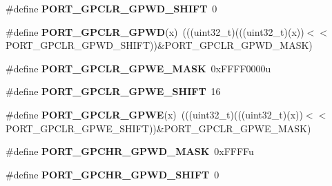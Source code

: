 \begin{DoxyCompactItemize}
\item 
\#define {\bfseries P\+O\+R\+T\+\_\+\+G\+P\+C\+L\+R\+\_\+\+G\+P\+W\+D\+\_\+\+S\+H\+I\+FT}~0\hypertarget{group__PORT__Register__Masks_gaafacaac0aa215f596b947609857d6491}{}\label{group__PORT__Register__Masks_gaafacaac0aa215f596b947609857d6491}

\item 
\#define {\bfseries P\+O\+R\+T\+\_\+\+G\+P\+C\+L\+R\+\_\+\+G\+P\+WD}(x)~(((uint32\+\_\+t)(((uint32\+\_\+t)(x))$<$$<$P\+O\+R\+T\+\_\+\+G\+P\+C\+L\+R\+\_\+\+G\+P\+W\+D\+\_\+\+S\+H\+I\+FT))\&P\+O\+R\+T\+\_\+\+G\+P\+C\+L\+R\+\_\+\+G\+P\+W\+D\+\_\+\+M\+A\+SK)\hypertarget{group__PORT__Register__Masks_gae13a63b19950557e19c9a884f3d3b77a}{}\label{group__PORT__Register__Masks_gae13a63b19950557e19c9a884f3d3b77a}

\item 
\#define {\bfseries P\+O\+R\+T\+\_\+\+G\+P\+C\+L\+R\+\_\+\+G\+P\+W\+E\+\_\+\+M\+A\+SK}~0x\+F\+F\+F\+F0000u\hypertarget{group__PORT__Register__Masks_ga49c4160370859546837be80a2eed1365}{}\label{group__PORT__Register__Masks_ga49c4160370859546837be80a2eed1365}

\item 
\#define {\bfseries P\+O\+R\+T\+\_\+\+G\+P\+C\+L\+R\+\_\+\+G\+P\+W\+E\+\_\+\+S\+H\+I\+FT}~16\hypertarget{group__PORT__Register__Masks_ga340d6aadd9516b3cac26187b014ce9d3}{}\label{group__PORT__Register__Masks_ga340d6aadd9516b3cac26187b014ce9d3}

\item 
\#define {\bfseries P\+O\+R\+T\+\_\+\+G\+P\+C\+L\+R\+\_\+\+G\+P\+WE}(x)~(((uint32\+\_\+t)(((uint32\+\_\+t)(x))$<$$<$P\+O\+R\+T\+\_\+\+G\+P\+C\+L\+R\+\_\+\+G\+P\+W\+E\+\_\+\+S\+H\+I\+FT))\&P\+O\+R\+T\+\_\+\+G\+P\+C\+L\+R\+\_\+\+G\+P\+W\+E\+\_\+\+M\+A\+SK)\hypertarget{group__PORT__Register__Masks_ga52502515ea180d574d919f0ec155da74}{}\label{group__PORT__Register__Masks_ga52502515ea180d574d919f0ec155da74}

\item 
\#define {\bfseries P\+O\+R\+T\+\_\+\+G\+P\+C\+H\+R\+\_\+\+G\+P\+W\+D\+\_\+\+M\+A\+SK}~0x\+F\+F\+F\+Fu\hypertarget{group__PORT__Register__Masks_ga4f288d1140184d41384f459c263d6e63}{}\label{group__PORT__Register__Masks_ga4f288d1140184d41384f459c263d6e63}

\item 
\#define {\bfseries P\+O\+R\+T\+\_\+\+G\+P\+C\+H\+R\+\_\+\+G\+P\+W\+D\+\_\+\+S\+H\+I\+FT}~0\hypertarget{group__PORT__Register__Masks_gab4464bb98b737fbf75d42682fef3c09c}{}\label{group__PORT__Register__Masks_gab4464bb98b737fbf75d42682fef3c09c}


\end{DoxyCompactItemize}

